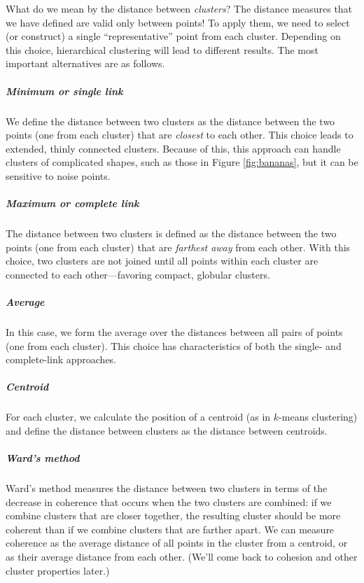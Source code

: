 What do we mean by the distance  between \emph{clusters}? The distance
measures that we have defined are valid only between points! To apply
them, we need to select (or construct) a single ``representative''
point from each cluster. Depending on this choice, hierarchical
clustering will lead to different results. The most important
alternatives are as follows.

\begin{unnumlist}
\subparagraph{Minimum or single link}
\item
We define the distance between two
  clusters as the distance between the two points (one from each
  cluster)\vadjust{\pagebreak} that are \emph{closest} to each other.  This
choice leads
  to extended, thinly connected clusters. Because of this, this
  approach can handle clusters of complicated shapes, such as those in
  Figure \ref{fig:bananas}, but it can be sensitive to noise points.

\subparagraph{Maximum or complete link}
\item
The distance between two clusters is
  defined as the distance between the two points (one from each cluster)
  that are \emph{farthest away} from each other. With this choice, two
  clusters are not joined until all points within each cluster are 
  connected to each other---favoring compact, globular clusters.

\subparagraph{Average}
\item
In this case, we form the average over the distances
  between all pairs of points (one from each cluster).  This choice
  has characteristics of both the single- and complete-link
  approaches.

\subparagraph{Centroid}
\item
For each cluster, we
calculate the position of a 
  centroid (as in $k$-means clustering) and define the distance between
  clusters as the distance between centroids.

\subparagraph{Ward's method}
\item
Ward's method  measures
the distance between two
  clusters in terms of the decrease in coherence that occurs when the
  two clusters are combined: if we combine clusters that are closer
  together, the resulting cluster should be more coherent than if we
  combine clusters that are farther apart. We can measure coherence as
  the average distance of all points in the cluster from a centroid,
  or as their average distance from each other. (We'll come back to
  cohesion and other cluster properties later.)
\end{unnumlist}

